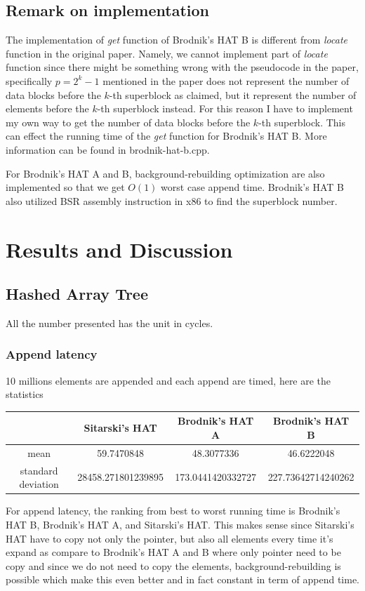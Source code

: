 \documentclass{article} %
\begin{document}
    \subsection*{Remark on implementation}
    The implementation of \emph{get} function of Brodnik's HAT B is different from \emph{locate} function in the original paper.
    Namely, we cannot implement part of \emph{locate} function since there might be something wrong with the pseudocode in the paper,
    specifically \emph{$p=2^k - 1$} mentioned in the paper does not represent the number of data blocks before the $k$-th superblock as claimed,
    but it represent the number of elements before the $k$-th superblock instead. For this reason I have to implement my own way to get the number of
    data blocks before the $k$-th superblock. This can effect the running time of the \emph{get} function for Brodnik's HAT B. More information can be found in brodnik-hat-b.cpp.

    For Brodnik's HAT A and B, background-rebuilding optimization are also implemented so that we get $O(1)$ worst case append time. Brodnik's HAT B also utilized BSR assembly instruction in x86 to find
    the superblock number.

    \section*{Results and Discussion}
    \subsection*{Hashed Array Tree}
    All the number presented has the unit in cycles.
    \subsubsection*{Append latency}
    10 millions elements are appended and each append are timed, here are the statistics
    \begin{center}
        \begin{tabular}{|c|c|c|c|}\hline
            & Sitarski's HAT & Brodnik's HAT A & Brodnik's HAT B\\\hline
            mean &  59.7470848 & 48.3077336 & 46.6222048\\\hline
            standard deviation & 28458.271801239895  & 173.0441420332727 & 227.73642714240262\\\hline 
        \end{tabular}
    \end{center}
    For append latency, the ranking from best to worst running time is Brodnik's HAT B, Brodnik's HAT A, and Sitarski's HAT.
    This makes sense since Sitarski's HAT have to copy not only the pointer, but also all elements every time it's expand as compare to Brodnik's HAT A
    and B where only pointer need to be copy and since we do not need to copy the elements, background-rebuilding is possible which make this even better and in fact constant in term of append time.
    
\end{document}
